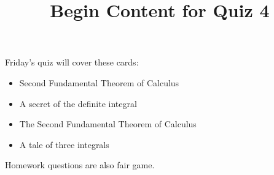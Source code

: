 \documentclass{ximera}
\title{Begin Content for Quiz 4}
\begin{document}
\begin{abstract}
\end{abstract}

\maketitle

\begin{sectionOutcomes}

Friday's quiz will cover these cards:






\begin{itemize}
\item Second Fundamental Theorem of Calculus
\item A secret of the definite integral
\item The Second Fundamental Theorem of Calculus
\item A tale of three integrals
\end{itemize}

Homework questions are also fair game.

\end{sectionOutcomes}
\end{document}
